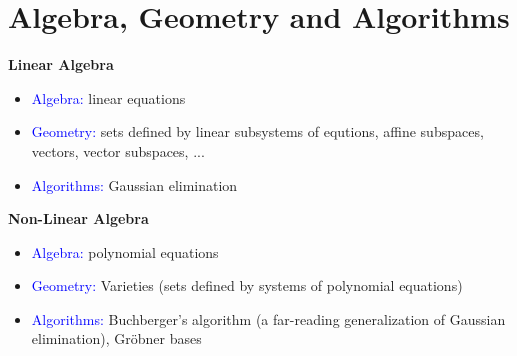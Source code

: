 \section{Algebra, Geometry and Algorithms} 

\textbf{{Linear Algebra}} 
\normalsize
\begin{itemize}
    \item \textcolor{blue}{Algebra:} linear equations 
    \item \textcolor{blue}{Geometry:} sets defined by linear subsystems of equtions, affine subspaces, vectors, vector subspaces, ... 
    \item \textcolor{blue}{Algorithms:} Gaussian elimination
\end{itemize}
\begin{center}
\end{center}

\textbf{{Non-Linear Algebra}}
\normalsize
\begin{itemize}
    \item \textcolor{blue}{Algebra:} polynomial equations 
    \item \textcolor{blue}{Geometry:} Varieties (sets defined by systems of polynomial equations) 
    \item \textcolor{blue}{Algorithms:} Buchberger's algorithm (a far-reading generalization of Gaussian elimination), Gröbner bases
\end{itemize}

